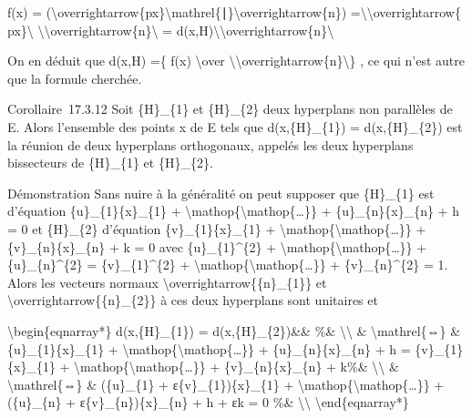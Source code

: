 \documentclass[]{article}
\begin{document}
\textbar{}f(x)\textbar{} =
\textbar{}(\textbackslash{}overrightarrow\{px\}\textbackslash{}mathrel\{∣\}\textbackslash{}overrightarrow\{n\})\textbar{}
=\textbackslash{}\textbar{}\textbackslash{}overrightarrow\{
px\}\textbackslash{}\textbar{}
\textbackslash{}\textbar{}\textbackslash{}overrightarrow\{n\}\textbackslash{}\textbar{}
=
d(x,H)\textbackslash{}\textbar{}\textbackslash{}overrightarrow\{n\}\textbackslash{}\textbar{}

On en déduit que d(x,H) =\{ \textbar{}f(x)\textbar{}
\textbackslash{}over
\textbackslash{}\textbar{}\textbackslash{}overrightarrow\{n\}\textbackslash{}\textbar{}\}
, ce qui n'est autre que la formule cherchée.

Corollaire~17.3.12 Soit \{H\}\_\{1\} et \{H\}\_\{2\} deux hyperplans non
parallèles de E. Alors l'ensemble des points x de E tels que
d(x,\{H\}\_\{1\}) = d(x,\{H\}\_\{2\}) est la réunion de deux hyperplans
orthogonaux, appelés les deux hyperplans bissecteurs de \{H\}\_\{1\} et
\{H\}\_\{2\}.

Démonstration Sans nuire à la généralité on peut supposer que
\{H\}\_\{1\} est d'équation \{u\}\_\{1\}\{x\}\_\{1\} +
\textbackslash{}mathop\{\textbackslash{}mathop\{\ldots{}\}\} +
\{u\}\_\{n\}\{x\}\_\{n\} + h = 0 et \{H\}\_\{2\} d'équation
\{v\}\_\{1\}\{x\}\_\{1\} +
\textbackslash{}mathop\{\textbackslash{}mathop\{\ldots{}\}\} +
\{v\}\_\{n\}\{x\}\_\{n\} + k = 0 avec \{u\}\_\{1\}\^{}\{2\} +
\textbackslash{}mathop\{\textbackslash{}mathop\{\ldots{}\}\} +
\{u\}\_\{n\}\^{}\{2\} = \{v\}\_\{1\}\^{}\{2\} +
\textbackslash{}mathop\{\textbackslash{}mathop\{\ldots{}\}\} +
\{v\}\_\{n\}\^{}\{2\} = 1. Alors les vecteurs normaux
\textbackslash{}overrightarrow\{\{n\}\_\{1\}\} et
\textbackslash{}overrightarrow\{\{n\}\_\{2\}\} à ces deux hyperplans
sont unitaires et

\textbackslash{}begin\{eqnarray*\} d(x,\{H\}\_\{1\}) =
d(x,\{H\}\_\{2\})\&\& \%\& \textbackslash{}\textbackslash{} \&
\textbackslash{}mathrel\{⇔\} \& \textbar{}\{u\}\_\{1\}\{x\}\_\{1\} +
\textbackslash{}mathop\{\textbackslash{}mathop\{\ldots{}\}\} +
\{u\}\_\{n\}\{x\}\_\{n\} + h\textbar{} =
\textbar{}\{v\}\_\{1\}\{x\}\_\{1\} +
\textbackslash{}mathop\{\textbackslash{}mathop\{\ldots{}\}\} +
\{v\}\_\{n\}\{x\}\_\{n\} + k\textbar{}\%\&
\textbackslash{}\textbackslash{} \& \textbackslash{}mathrel\{⇔\} \&
(\{u\}\_\{1\} + ε\{v\}\_\{1\})\{x\}\_\{1\} +
\textbackslash{}mathop\{\textbackslash{}mathop\{\ldots{}\}\} +
(\{u\}\_\{n\} + ε\{v\}\_\{n\})\{x\}\_\{n\} + h + εk = 0 \%\&
\textbackslash{}\textbackslash{} \textbackslash{}end\{eqnarray*\}
\end{document}
